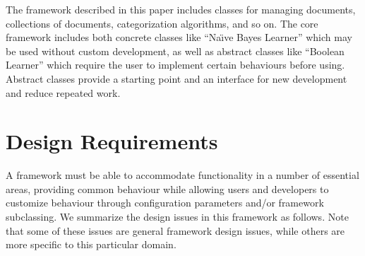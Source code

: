 \documentclass[a4paper,twocolumn]{article}
\begin{document}
The framework described in this paper includes classes for managing documents, collections of documents, categorization algorithms, and so on.  The core framework includes both concrete classes like ``Na\"\i ve Bayes Learner'' which may be used without custom development, as well as abstract classes  like ``Boolean Learner'' which require the user to implement certain behaviours before using.  Abstract classes provide a starting point and an interface for new development and reduce repeated work.


\section{Design Requirements}

A framework must be able to accommodate functionality in a number of essential areas, providing common behaviour while allowing users and developers to customize behaviour through configuration parameters and/or framework subclassing.  We summarize the design issues in this framework as follows.  Note that some of these issues are general framework design issues, while others are more specific to this particular domain.
\end{document}

